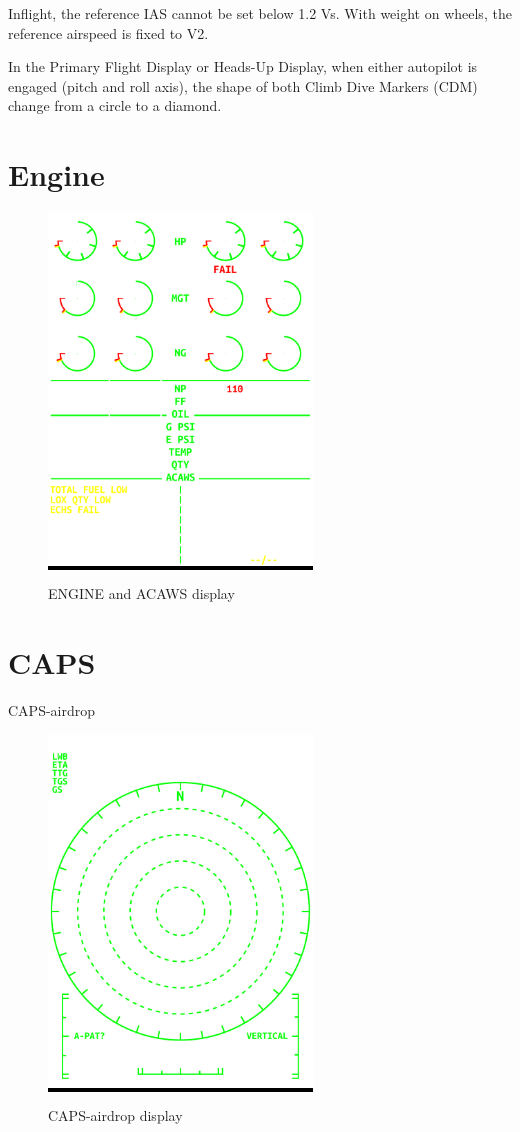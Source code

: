 Inflight, the reference IAS cannot be set below 1.2 Vs. With weight on wheels, the reference airspeed is fixed to V2.

In the Primary Flight Display or Heads-Up Display, when either autopilot is engaged (pitch and roll axis), the shape of both Climb Dive Markers (CDM) change from a circle to a diamond.

\newpage
\section{Engine}

\begin{figure}[h]
  \centering
  \colorbox{black}{\includegraphics[width=7cm]{figures/hdd/EICAS}}
  \caption{ENGINE and ACAWS display}
\end{figure}

\newpage
\section{CAPS}
\label{sec:caps-airdrop}

\gls{CAPS-airdrop}

\begin{figure}[h]
  \centering
  \colorbox{black}{\includegraphics[width=7cm]{figures/hdd/CAPS}}
  \caption{\gls{CAPS-airdrop} display}
\end{figure}


